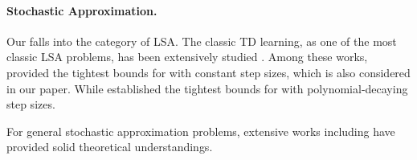 \paragraph{Stochastic Approximation.}
Our {\LCTD} falls into the category of LSA. 
The classic TD learning, as one of the most classic LSA problems, has been extensively studied \citep{bertsekas1995neuro, tsitsiklis1996analysis, bhandari2018finite, dalal2018finite, patil2023finite,duan2023finite,li2024q,li2024high,samsonov2024gaussian, wu2024statistical}. 
Among these works, \cite{li2024high,samsonov2024improved} provided the tightest bounds for {\LTD} with constant step sizes, which is also considered in our paper.
While \cite{wu2024statistical} established the tightest bounds for {\LTD} with polynomial-decaying step sizes.

For general stochastic approximation problems, extensive works including \citep{lakshminarayanan2018linear,srikant2019finite,mou2020linear,mou2022optimal,huo2023bias,li2023online,durmus2024finite,samsonov2024improved, chen2024lyapunov} have provided solid theoretical understandings.
